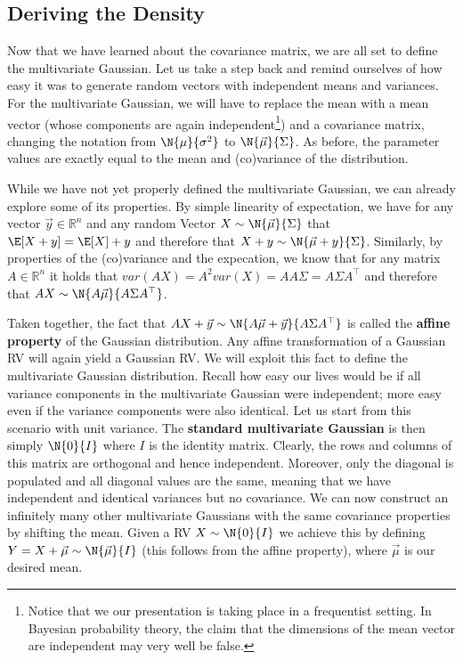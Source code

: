 \subsection{Deriving the Density}

Now that we have learned about the covariance matrix, we are all set to define the multivariate Gaussian. Let us take a step back and remind ourselves of how easy
it was to generate random vectors with independent means and variances. For the multivariate Gaussian, we will have to replace the mean with a mean vector (whose
components are again independent\footnote{Notice that we our presentation is taking place in a frequentist setting. In Bayesian probability theory, the claim that
the dimensions of the mean vector are independent may very well be false.}) and a covariance matrix, changing the notation from $ \N{\mu}{\sigma^{2}} $
to $ \N{\vec{\mu}}{\Sigma} $. As before, the parameter values are exactly equal to the mean and (co)variance of the distribution.

While we have not yet properly defined the multivariate Gaussian, we can already explore some of its properties. By simple linearity of expectation, we have
for any vector $ \vec{y} \in \mathbb{R}^{n} $ and any random Vector $ X \sim \N{\vec{\mu}}{\Sigma} $ that $ \E[X + y] = \E[X] + y $ and therefore that
$ X + y \sim \N{\vec{\mu} + y}{\Sigma} $. Similarly, by properties of the (co)variance and the expecation, 
we know that for any matrix $ A \in \mathbb{R}^{n} $ it holds that
$ var(AX) = A^{2}var(X) = AA\Sigma = A\Sigma A^{\top} $ and therefore that $ AX \sim \N{A\vec{\mu}}{A\Sigma A^{\top}} $. 

Taken together, the fact that $ AX + \vec{y} \sim \N{A\vec{\mu} + \vec{y}}{A\Sigma A^{\top}} $ is called the \textbf{affine property} of the Gaussian distribution.
Any affine transformation of a Gaussian RV will again yield a Gaussian RV. We will exploit this fact to define the multivariate Gaussian distribution. Recall
how easy our lives would be if all variance components in the multivariate Gaussian were independent; more easy even if the variance components were also identical.
Let us start from this scenario with unit variance. The \textbf{standard multivariate Gaussian} is then simply $ \N{0}{I} $ where $ I $ is the identity matrix. Clearly,
the rows and columns of this matrix are orthogonal and hence independent. Moreover, only the diagonal is populated and all diagonal values are the same, meaning
that we have independent and identical variances but no covariance. We can now construct an infinitely many other multivariate Gaussians with the same covariance
properties by shifting the mean. Given a RV $ X \sim \N{0}{I} $ we achieve this by defining $ Y = X + \vec{\mu} \sim \N{\vec{\mu}}{I} $ (this follows from the affine 
property), where $ \vec{\mu} $ is our desired mean.

